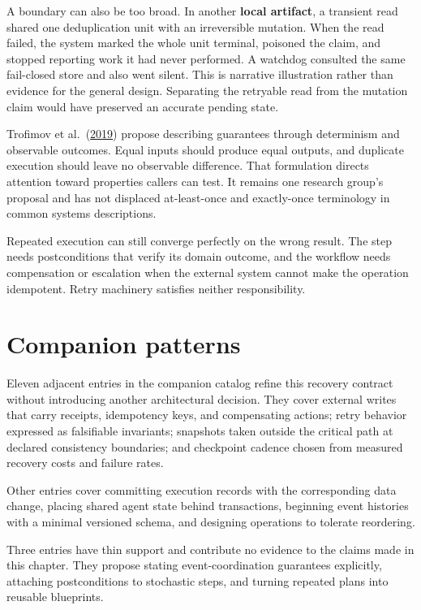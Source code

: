 A boundary can also be too broad. In another \textbf{local artifact}, a transient read shared one deduplication unit with an irreversible mutation. When the read failed, the system marked the whole unit terminal, poisoned the claim, and stopped reporting work it had never performed. A watchdog consulted the same fail-closed store and also went silent. This is narrative illustration rather than evidence for the general design. Separating the retryable read from the mutation claim would have preserved an accurate pending state.

Trofimov et al.~(\href{https://arxiv.org/abs/1907.06250}{2019}) propose describing guarantees through determinism and observable outcomes. Equal inputs should produce equal outputs, and duplicate execution should leave no observable difference. That formulation directs attention toward properties callers can test. It remains one research group's proposal and has not displaced at-least-once and exactly-once terminology in common systems descriptions.

Repeated execution can still converge perfectly on the wrong result. The step needs postconditions that verify its domain outcome, and the workflow needs compensation or escalation when the external system cannot make the operation idempotent. Retry machinery satisfies neither responsibility.

\hypertarget{companion-patterns}{%
\section{Companion patterns}\label{companion-patterns}}

Eleven adjacent entries in the companion catalog refine this recovery contract without introducing another architectural decision. They cover external writes that carry receipts, idempotency keys, and compensating actions; retry behavior expressed as falsifiable invariants; snapshots taken outside the critical path at declared consistency boundaries; and checkpoint cadence chosen from measured recovery costs and failure rates.

Other entries cover committing execution records with the corresponding data change, placing shared agent state behind transactions, beginning event histories with a minimal versioned schema, and designing operations to tolerate reordering.

Three entries have thin support and contribute no evidence to the claims made in this chapter. They propose stating event-coordination guarantees explicitly, attaching postconditions to stochastic steps, and turning repeated plans into reusable blueprints.

